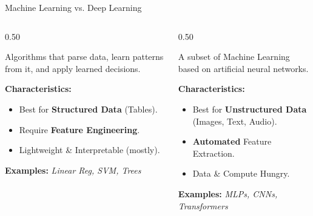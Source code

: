 \begin{frame}{Machine Learning vs. Deep Learning}
    \centering
    \begin{columns}[T]
        \begin{column}{0.50\textwidth}
            \begin{tcolorbox}[colback=green!5, title=\textbf{1. Machine Learning (ML)}]
                Algorithms that parse data, learn patterns from it, and apply learned decisions.
            \end{tcolorbox}
            
            \vspace{0.5em}
            \textbf{Characteristics:}
            \begin{itemize}
                \item Best for \textbf{Structured Data} (Tables).
                \item Require \textbf{Feature Engineering}.
                \item Lightweight \& Interpretable (mostly).
            \end{itemize}
            
            \vspace{0.5em}
            \centering
            \textbf{Examples:}
            \footnotesize \textit{Linear Reg, SVM, Trees}
        \end{column}

        \begin{column}{0.50\textwidth}
            \begin{tcolorbox}[colback=blue!5, title=\textbf{2. Deep Learning (DL)}]
                A subset of Machine Learning based on artificial neural networks.
            \end{tcolorbox}
            
            \vspace{0.5em}
            \textbf{Characteristics:}
            \begin{itemize}
                \item Best for \textbf{Unstructured Data} (Images, Text, Audio).
                \item \textbf{Automated} Feature Extraction.
                \item Data \& Compute Hungry.
            \end{itemize}
            
            \vspace{0.5em}
            \centering
            \textbf{Examples:}
            \footnotesize \textit{MLPs, CNNs, Transformers}
        \end{column}
    \end{columns}
\end{frame}

